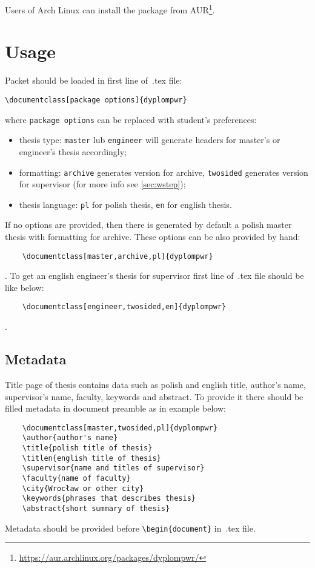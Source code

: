 \documentclass[12pt,a4paper]{article}
\begin{document}
Users of Arch Linux can install the package from
AUR\footnote{\url{https://aur.archlinux.org/packages/dyplompwr/}}. 

\section{Usage}
\par Packet should be loaded in first line of~.tex file:
\begin{verbatim}
\documentclass[package options]{dyplompwr}
\end{verbatim} 
where \verb|package options| can be replaced with student's preferences:
\begin{itemize}
    \item thesis type: \verb|master| lub \verb|engineer| will generate
        headers for master's or engineer's thesis accordingly;
    \item formatting: \verb|archive| generates version for archive,
        \verb|twosided| generates version for supervisor (for more info see
        \cref{sec:wstep});
    \item thesis language: \verb|pl| for polish thesis, \verb|en| for english thesis.
\end{itemize}
If no options are provided, then there is generated by default a polish master thesis with formatting for archive.
These options can be also provided by hand:
\begin{verbatim}
    \documentclass[master,archive,pl]{dyplompwr}
\end{verbatim}.
To get an english engineer's thesis for supervisor first line of~.tex file
should be like below:
\begin{verbatim} 
    \documentclass[engineer,twosided,en]{dyplompwr}
\end{verbatim}.
\subsection{Metadata} 
Title page of thesis contains data such as polish and english title, author's
name, supervisor's name, faculty, keywords and abstract. To provide it there
should be filled metadata in document preamble as in example below:
\begin{verbatim} 
    \documentclass[master,twosided,pl]{dyplompwr}
    \author{author's name}
    \title{polish title of thesis}
    \titlen{english title of thesis}
    \supervisor{name and titles of supervisor}
    \faculty{name of faculty}
    \city{Wrocław or other city}
    \keywords{phrases that describes thesis}
    \abstract{short summary of thesis}
\end{verbatim}
Metadata should be provided before \verb|\begin{document}| in~.tex file.
\end{document}
